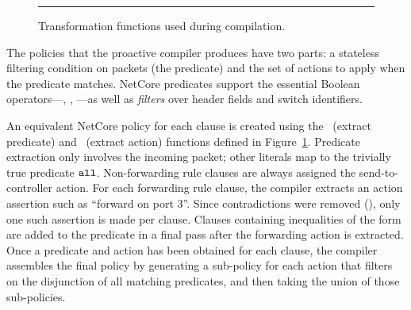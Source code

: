 \begin{figure}
\normalsize
\caption{\small Transformation functions used during compilation.}
\label{fig:peval-funcs}
\hrule
\end{figure}
The policies that the proactive compiler produces have two parts: a stateless filtering
condition on packets (the predicate) and the set of actions to apply when the
predicate matches. NetCore predicates support the essential Boolean
operators---, , ---as well as \emph{filters} over header
fields and switch identifiers.

An equivalent NetCore policy for each clause is created
using the \EP\ (extract predicate) and \EA\ (extract action) functions defined in
Figure~\ref{fig:peval-funcs}. Predicate extraction only involves
the incoming packet; other literals map to the
trivially true predicate $\text{{\tt all}}$.
Non-forwarding rule clauses are always assigned the send-to-controller action. 
For each forwarding rule clause, the compiler extracts an action assertion such as ``forward on port 3''. Since
contradictions were removed (), only one such assertion is made per
clause. Clauses containing inequalities of the
form  are added to the predicate in a final pass
after the forwarding action is extracted. 
Once a predicate and action has been obtained for each clause, the compiler assembles the
final policy by generating a sub-policy for each action that filters on the disjunction
of all matching predicates, and then taking the union of those sub-policies. 


